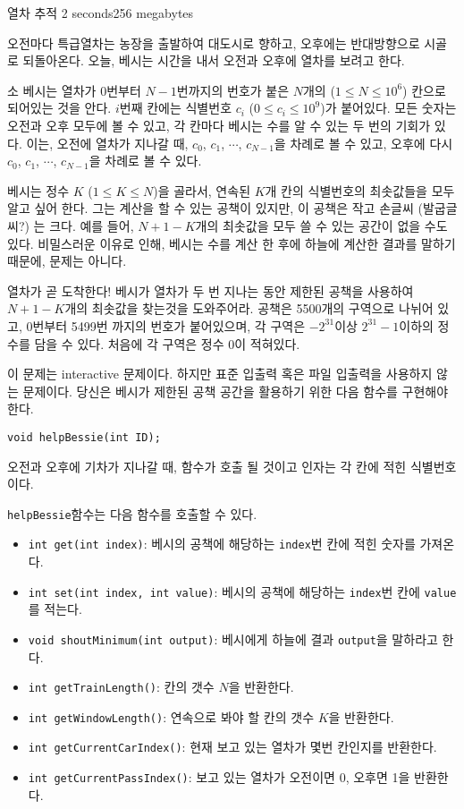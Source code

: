 \begin{problem}{열차 추적}
	{}{}
	{2 seconds}{256 megabytes}{}

	오전마다 특급열차는 농장을 출발하여 대도시로 향하고, 오후에는 반대방향으로 시골로 되돌아온다. 오늘, 베시는 시간을 내서 오전과 오후에 열차를 보려고 한다.
	
	소 베시는 열차가 0번부터 $N-1$번까지의 번호가 붙은 $N$개의 ($1 \le N \le 10^6$) 칸으로 되어있는 것을 안다. $i$번째 칸에는 식별번호 $c_i$ ($0 \le c_i \le 10^9$)가 붙어있다. 모든 숫자는 오전과 오후 모두에 볼 수 있고, 각 칸마다 베시는 수를 알 수 있는 두 번의 기회가 있다.
	이는, 오전에 열차가 지나갈 때, $c_0$, $c_1$, $\cdots$, $c_{N-1}$을 차례로 볼 수 있고, 오후에 다시 $c_0$, $c_1$, $\cdots$, $c_{N-1}$을 차례로 볼 수 있다.

	베시는 정수 $K$ ($1 \le K \le N$)을 골라서, 연속된 $K$개 칸의 식별번호의 최솟값들을 모두 알고 싶어 한다. 그는 계산을 할 수 있는 공책이 있지만, 이 공책은 작고 손글씨 (발굽글씨?) 는 크다. 예를 들어, $N+1-K$개의 최솟값을 모두 쓸 수 있는 공간이 없을 수도 있다. 비밀스러운 이유로 인해, 베시는 수를 계산 한 후에 하늘에 계산한 결과를 말하기 때문에, 문제는 아니다.

	열차가 곧 도착한다! 베시가 열차가 두 번 지나는 동안 제한된 공책을 사용하여 $N+1-K$개의 최솟값을 찾는것을 도와주어라. 공책은 5500개의 구역으로 나뉘어 있고, 0번부터 5499번 까지의 번호가 붙어있으며, 각 구역은 $-2^{31}$이상 $2^{31}-1$이하의 정수를 담을 수 있다. 처음에 각 구역은 정수 0이 적혀있다.

	이 문제는 interactive 문제이다. 하지만 표준 입출력 혹은 파일 입출력을 사용하지 않는 문제이다. 당신은 베시가 제한된 공책 공간을 활용하기 위한 다음 함수를 구현해야 한다.
	
	\texttt{void helpBessie(int ID);}
	
	오전과 오후에 기차가 지나갈 때, 함수가 호출 될 것이고 인자는 각 칸에 적힌 식별번호이다.	

	\texttt{helpBessie}함수는 다음 함수를 호출할 수 있다.
	
	\begin{itemize}
	\item \texttt{int get(int index)}: 베시의 공책에 해당하는 \texttt{index}번 칸에 적힌 숫자를 가져온다.
	\item \texttt{int set(int index, int value)}: 베시의 공책에 해당하는 \texttt{index}번 칸에 \texttt{value}를 적는다.
	\item \texttt{void shoutMinimum(int output)}: 베시에게 하늘에 결과 \texttt{output}을 말하라고 한다.
	\item \texttt{int getTrainLength()}: 칸의 갯수 $N$을 반환한다.
	\item \texttt{int getWindowLength()}: 연속으로 봐야 할 칸의 갯수 $K$을 반환한다.
	\item \texttt{int getCurrentCarIndex()}: 현재 보고 있는 열차가 몇번 칸인지를 반환한다.
	\item \texttt{int getCurrentPassIndex()}: 보고 있는 열차가 오전이면 0, 오후면 1을 반환한다.
	\end{itemize}


\end{problem}
